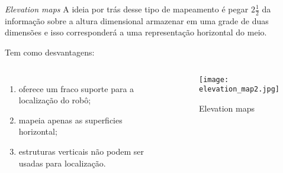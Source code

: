 \begin{frame}[t]{\textit{Elevation maps}} 
    \transdissolve[duration=0.5]
    A ideia por trás desse tipo de mapeamento é pegar $2\frac{1}{2}$ da informação sobre a altura dimensional armazenar em uma grade de duas dimensões e isso corresponderá a uma representação horizontal do meio.
    
    Tem como desvantagens:
        \begin{columns}[t]
                \begin{enumerate}
                    \item oferece um fraco suporte para a localização do robô;
                    \item mapeia apenas as superficies horizontal;
                    \item estruturas verticais não podem ser usadas para localização.
                \end{enumerate}
            \begin{center}
                \begin{figure}
                    \texttt{[image: elevation\_map2.jpg]}
                    \caption{Elevation maps\cite{article}}
                \end{figure}
            \end{center}
        \end{columns}
\end{frame}

